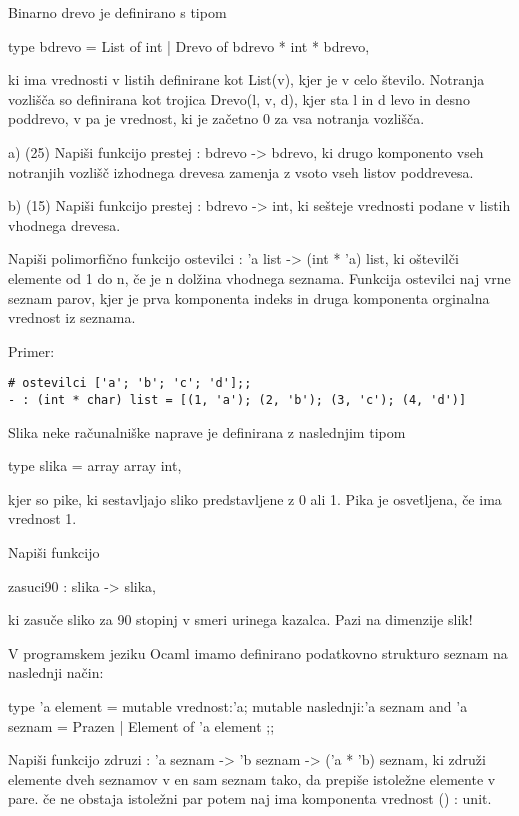 \begin{ex}
  Binarno drevo je definirano s tipom

  type bdrevo = List of int | Drevo of bdrevo * int * bdrevo,

  ki ima vrednosti v listih definirane kot List(v), kjer je v celo \v
  stevilo.  Notranja vozli\v s\v ca so definirana kot trojica Drevo(l,
  v, d), kjer sta l in d levo in desno poddrevo, v pa je vrednost, ki
  je za\v cetno 0 za vsa notranja vozli\v s\v ca.

  a) (25) Napi\v si funkcijo prestej : bdrevo -> bdrevo, ki drugo
  komponento vseh notranjih vozli\v s\v c izhodnega drevesa zamenja z
  vsoto vseh listov poddrevesa.

  b) (15) Napi\v si funkcijo prestej : bdrevo -> int, ki se\v steje
  vrednosti podane v listih vhodnega drevesa.

\end{ex} 
\begin{ex}
  Napi\v si polimorfi\v cno funkcijo ostevilci : 'a list -> (int * 'a)
  list, ki o\v stevil\v ci elemente od 1 do n, \v ce je n dol\v zina
  vhodnega seznama. Funkcija ostevilci naj vrne seznam parov, kjer je
  prva komponenta indeks in druga komponenta orginalna vrednost iz
  seznama.

\noindent\/Primer:
\begin{verbatim}
# ostevilci ['a'; 'b'; 'c'; 'd'];; 
- : (int * char) list = [(1, 'a'); (2, 'b'); (3, 'c'); (4, 'd')]
\end{verbatim}

\end{ex} 
\begin{ex}
  Slika neke ra\v cunalni\v ske naprave je definirana z naslednjim
  tipom

  type slika = array array int,

  kjer so pike, ki sestavljajo sliko predstavljene z 0 ali 1. Pika je
  osvetljena, \v ce ima vrednost 1.

  Napi\v si funkcijo

  zasuci90 : slika -> slika,

  ki zasu\v ce sliko za 90 stopinj v smeri urinega kazalca. Pazi na
  dimenzije slik!


\end{ex} 
\begin{ex}
  V programskem jeziku Ocaml imamo definirano podatkovno strukturo
  seznam na naslednji na\v cin:

  type 'a element = { 
     mutable vrednost:'a; 
     mutable naslednji:'a seznam 
  } 
  and 'a seznam = Prazen | Element of 'a element ;; 

  Napi\v si funkcijo zdruzi : 'a seznam -> 'b seznam -> ('a * 'b)
  seznam, ki zdru\v zi elemente dveh seznamov v en sam seznam tako, da
  prepi\v se istole\v zne elemente v pare. \v ce ne obstaja istole\v
  zni par potem naj ima komponenta vrednost () : unit.

 
\end{ex} 
